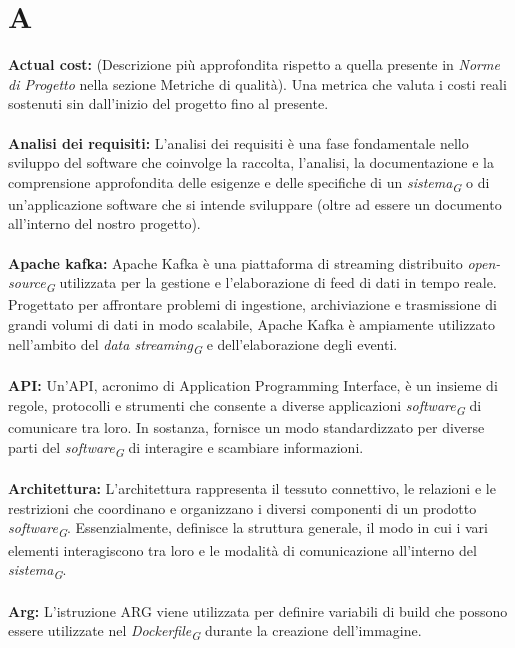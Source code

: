\documentclass{article}
\begin{document}
\section*{A}
{}
\textbf{Actual cost:} (Descrizione più approfondita rispetto a quella presente in \textit{Norme di Progetto} nella sezione Metriche di qualità). Una metrica che valuta i costi reali sostenuti sin dall'inizio del progetto fino al presente.
\\
\\
\textbf{Analisi dei requisiti:} L'analisi dei requisiti è una fase fondamentale nello sviluppo del software che coinvolge la raccolta, l'analisi, la documentazione e la comprensione approfondita delle esigenze e delle specifiche di un \textit{sistema}\textsubscript{\textit{G}} o di un'applicazione software che si intende sviluppare (oltre ad essere un documento all’interno del nostro progetto).
\\
\\
\textbf{Apache kafka:} Apache Kafka è una piattaforma di streaming distribuito \textit{open-source}\textsubscript{\textit{G}} utilizzata per la gestione e l'elaborazione di feed di dati in tempo reale. Progettato per affrontare problemi di ingestione, archiviazione e trasmissione di grandi volumi di dati in modo scalabile, Apache Kafka è ampiamente utilizzato nell'ambito del \textit{data streaming}\textsubscript{\textit{G}} e dell'elaborazione degli eventi.
\\
\\
\textbf{API:} Un'API, acronimo di Application Programming Interface, è un insieme di regole, protocolli e strumenti che consente a diverse applicazioni \textit{software}\textsubscript{\textit{G}} di comunicare tra loro. In sostanza, fornisce un modo standardizzato per diverse parti del \textit{software}\textsubscript{\textit{G}} di interagire e scambiare informazioni.
\\
\\
\textbf{Architettura:} L'architettura rappresenta il tessuto connettivo, le relazioni e le restrizioni che coordinano e organizzano i diversi componenti di un prodotto \textit{software}\textsubscript{\textit{G}}. Essenzialmente, definisce la struttura generale, il modo in cui i vari elementi interagiscono tra loro e le modalità di comunicazione all'interno del \textit{sistema}\textsubscript{\textit{G}}.
\\
\\
\textbf{Arg:} L’istruzione ARG viene utilizzata per definire variabili di build che possono essere utilizzate nel \textit{Dockerfile}\textsubscript{\textit{G}} durante la creazione dell'immagine. 
\end{document}
